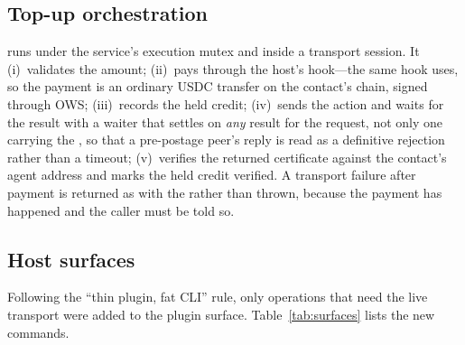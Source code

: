 \subsection{Top-up orchestration}

 runs under the service's execution mutex and inside a transport
session. It (i)~validates the amount; (ii)~pays through the host's
 hook---the same hook  uses, so the payment is an
ordinary USDC transfer on the contact's chain, signed through OWS; (iii)~records the held
credit; (iv)~sends the  action and waits for the result with a waiter
that settles on \emph{any} result for the request, not only one carrying the
, so that a pre-postage peer's  reply is read as
a definitive rejection rather than a timeout; (v)~verifies the returned certificate
against the contact's agent address and marks the held credit verified. A transport
failure after payment is returned as  with the 
rather than thrown, because the payment has happened and the caller must be told so.

\subsection{Host surfaces}

Following the ``thin plugin, fat CLI'' rule, only operations that need the live transport
were added to the plugin surface. Table~\ref{tab:surfaces} lists the new commands.

